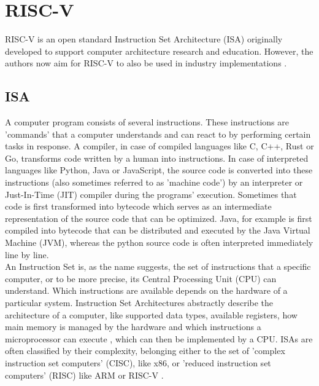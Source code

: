 

\section{RISC-V}

RISC-V \cite{riscv} is an open standard Instruction Set Architecture (ISA)
originally developed to support computer architecture research and education.
However, the authors now aim for RISC-V to also be used in industry implementations \cite[Cha 1]{riscv_spec}.

\subsection{ISA}

A computer program consists of several instructions.
These instructions are 'commands' that a computer understands and can react to by performing certain tasks in response.
A compiler, in case of compiled languages like C, C++, Rust or Go, transforms code written by a human into instructions.
In case of interpreted languages like Python, Java or JavaScript, the source code is converted into these instructions
(also sometimes referred to as 'machine code') by an interpreter or Just-In-Time (JIT) compiler during the programs' execution.
Sometimes that code is first transformed into bytecode which serves as an intermediate representation of the source code
that can be optimized.
Java, for example is first compiled into bytecode that can be distributed and executed by the Java Virtual Machine (JVM),
whereas the python source code is often interpreted immediately line by line.
\\
An Instruction Set is, as the name suggests, the set of instructions that a specific computer, or to be more precise,
its Central Processing Unit (CPU) can understand.
Which instructions are available depends on the hardware of a particular system.
Instruction Set Architectures abstractly describe the architecture of a computer,
like supported data types, available registers, how main memory is managed by the hardware and
which instructions a microprocessor can execute \cite{isa}, which can then be implemented by a CPU.
ISAs are often classified by their complexity, belonging either to the set of 'complex instruction set computers' (CISC), like x86,
or 'reduced instruction set computers' (RISC) like ARM \cite{arm_architecture} or RISC-V \cite{riscv_spec}.

